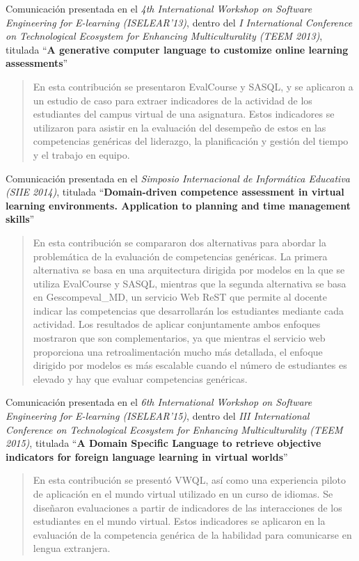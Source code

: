\noindent
Comunicación presentada en el \emph{4th International Workshop on Software Engineering for E-learning (ISELEAR’13)}, dentro del \emph{I International Conference on Technological Ecosystem for Enhancing Multiculturality (TEEM 2013)}, titulada ``\textbf{A generative computer language to customize online learning assessments}''~\cite{balderas2013generative}

\begin{quote}En esta contribución se presentaron EvalCourse y SASQL, y se aplicaron a un estudio de caso para extraer indicadores de la actividad de los estudiantes del campus virtual de una asignatura. Estos indicadores se utilizaron para asistir en la evaluación del desempeño de estos en las competencias genéricas del liderazgo, la planificación y gestión del tiempo y el trabajo en equipo.\end{quote}

\noindent
Comunicación presentada en el \emph{Simposio Internacional de Informática Educativa (SIIE 2014)}, titulada ``\textbf{Domain-driven competence assessment in virtual learning environments. Application to planning and time management skills}''~\cite{balderas2014domain}

\begin{quote}En esta contribución se compararon dos alternativas para abordar la problemática de la evaluación de competencias genéricas. La primera alternativa se basa en una arquitectura dirigida por modelos en la que se utiliza EvalCourse y SASQL, mientras que la segunda alternativa se basa en Gescompeval\_MD, un servicio Web ReST que permite al docente indicar las competencias que desarrollarán los estudiantes mediante cada actividad. Los resultados de aplicar conjuntamente ambos enfoques mostraron que son complementarios, ya que mientras el servicio web proporciona una retroalimentación mucho más detallada, el enfoque dirigido por modelos es más escalable cuando el número de estudiantes es elevado y hay que evaluar competencias genéricas.\end{quote}

\noindent
Comunicación presentada en el \emph{6th International Workshop on Software Engineering for E-learning (ISELEAR’15)}, dentro del \emph{III International Conference on Technological Ecosystem for Enhancing Multiculturality (TEEM 2015)}, titulada ``\textbf{A Domain Specific Language to retrieve objective indicators for foreign language learning in virtual worlds}''~\cite{balderas2015domain}

\begin{quote}En esta contribución se presentó VWQL, así como una experiencia piloto de aplicación en el mundo virtual utilizado en un curso de idiomas. Se diseñaron evaluaciones a partir de indicadores de las interacciones de los estudiantes en el mundo virtual. Estos indicadores se aplicaron en la evaluación de la competencia genérica de la habilidad para comunicarse en lengua extranjera.\end{quote}


